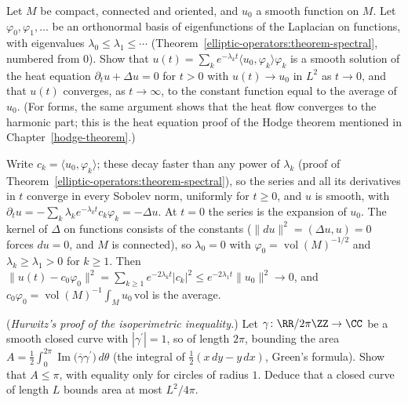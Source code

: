 \begin{exercise}\label{elliptic-operators:exercise-heat-equation}
Let $M$ be compact, connected and oriented, and $u_0$ a smooth function on $M$. Let $\varphi_0, \varphi_1, \ldots$ be an orthonormal basis of eigenfunctions of the Laplacian on functions, with
eigenvalues $\lambda_0 \leq \lambda_1 \leq \cdots$ (Theorem~\ref{elliptic-operators:theorem-spectral}, numbered from $0$). Show that $u(t) = \sum_ke^{-\lambda_kt}\langle u_0, \varphi_k\rangle\varphi_k$ is a smooth solution of the heat equation $\partial_tu + \Delta u = 0$ for $t > 0$ with $u(t) \to u_0$ in $L^2$ as $t \to 0$, and that $u(t)$ converges, as
$t \to \infty$, to the constant function equal to the average of $u_0$. (For forms, the same argument shows that the heat flow converges to the harmonic part; this is the heat equation proof of the
Hodge theorem mentioned in Chapter~\ref{hodge-theorem}.)
\end{exercise}

\begin{solution}
Write $c_k = \langle u_0, \varphi_k\rangle$; these decay faster than any power of $\lambda_k$ (proof of Theorem~\ref{elliptic-operators:theorem-spectral}), so the series and all its derivatives in $t$ converge in every
Sobolev norm, uniformly for $t \geq 0$, and $u$ is smooth, with $\partial_tu = -\sum_k\lambda_ke^{-\lambda_kt}c_k\varphi_k = -\Delta u$. At $t = 0$ the series is the expansion of $u_0$. The kernel of $\Delta$ on functions
consists of the constants ($\|du\|^2 = (\Delta u, u) = 0$ forces $du = 0$, and $M$ is connected), so $\lambda_0 = 0$ with $\varphi_0 = \operatorname{vol}(M)^{-1/2}$ and $\lambda_k \geq \lambda_1 > 0$ for $k \geq 1$. Then
$\|u(t) - c_0\varphi_0\|^2 = \sum_{k \geq 1}e^{-2\lambda_kt}|c_k|^2 \leq e^{-2\lambda_1t}\|u_0\|^2 \to 0$, and $c_0\varphi_0 = \operatorname{vol}(M)^{-1}\int_Mu_0\,\mathrm{vol}$ is the average.
\end{solution}

\begin{exercise}\label{elliptic-operators:exercise-isoperimetric}
(\emph{Hurwitz's proof of the isoperimetric inequality.}) Let $\gamma \colon \RR/2\pi\ZZ \to \CC$ be a smooth closed curve with $|\gamma^{\prime}| = 1$, so of length $2\pi$, bounding the area
$A = \frac12\int_0^{2\pi}\operatorname{Im}\bigl(\overline{\gamma}\gamma^{\prime}\bigr)\,d\theta$ (the integral of $\frac12(x\,dy - y\,dx)$, Green's formula). Show that $A \leq \pi$, with equality only for circles of radius
$1$. Deduce that a closed curve of length $L$ bounds area at most $L^2/4\pi$.
\end{exercise}

